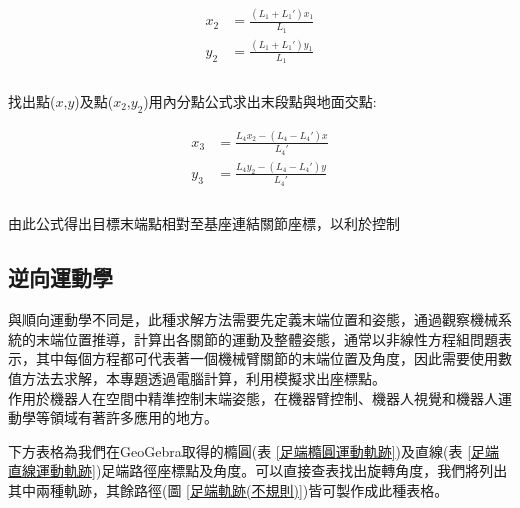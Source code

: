 \[
\begin{aligned}
x_{2}&= \frac{\left (L_{1} + L_{1}' \right) x_{1}}{L_{1}}\\
y_{2}&= \frac{\left (L_{1} + L_{1}' \right) y_{1}}{L_{1}}\\
\end{aligned}
\]\\

找出點($x$,$y$)及點($x_2$,$y_2$)用內分點公式求出末段點與地面交點:

\[
\begin{aligned}
x_{3}&= \frac{L_{4} x_{2} - \left (L_{4} - L_{4}' \right) x}{L_{4}'}\\
y_{3}&= \frac{L_{4} y_{2} - \left (L_{4} - L_{4}' \right) y}{L_{4}'}\\
\end{aligned}
\]\\

由此公式得出目標末端點相對至基座連結關節座標，以利於控制\\

\subsection{逆向運動學}
與順向運動學不同是，此種求解方法需要先定義末端位置和姿態，通過觀察機械系統的末端位置推導，計算出各關節的運動及整體姿態，通常以非線性方程組問題表示，其中每個方程都可代表著一個機械臂關節的末端位置及角度，因此需要使用數值方法去求解，本專題透過電腦計算，利用模擬求出座標點。\\

作用於機器人在空間中精準控制末端姿態，在機器臂控制、機器人視覺和機器人運動學等領域有著許多應用的地方。\
\newpage

下方表格為我們在GeoGebra取得的橢圓(表 \ref{足端橢圓運動軌跡})及直線(表 \ref{足端直線運動軌跡})足端路徑座標點及角度。可以直接查表找出旋轉角度，我們將列出其中兩種軌跡，其餘路徑(圖 \ref{足端軌跡(不規則)})皆可製作成此種表格。\\

